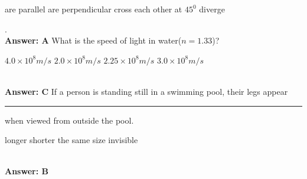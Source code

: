 \documentclass[12pt,addpoints]{exam}
\begin{document}
{{{\begin{questions}
\begin{oneparchoices}
						\choice are parallel
						\choice are perpendicular
						\choice cross each other at $45^0$
						\choice diverge
					\end{oneparchoices}.
					\\ \textbf{Answer: A}
					\question What is the speed of light in water($n=1.33$)?\\
					\begin{oneparchoices}
						\choice $4.0\times10^{8}m/s$
						\choice $2.0\times10^{8}m/s$
						\choice $2.25\times10^{8}m/s$
						\choice $3.0\times10^{8}m/s$
					\end{oneparchoices}
					\\ \textbf{Answer: C}
					\question If a person is standing still in a swimming pool, their legs appear \noindent\rule{1.5cm}{0.4pt} when viewed from outside the pool.\\
					\begin{oneparchoices}
						\choice longer
						\choice shorter
						\choice the same size
						\choice invisible
					\end{oneparchoices}
					\\ \textbf{Answer: B}

\end{questions}}}}
\end{document}
